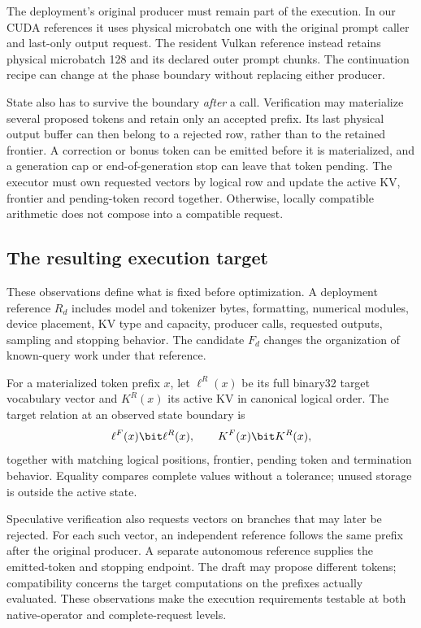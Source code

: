 The deployment's original producer must remain part of the execution. In our CUDA references it uses physical microbatch one with the original prompt caller and last-only output request. The resident Vulkan reference instead retains physical microbatch 128 and its declared outer prompt chunks. The continuation recipe can change at the phase boundary without replacing either producer.

State also has to survive the boundary \emph{after} a call. Verification may materialize several proposed tokens and retain only an accepted prefix. Its last physical output buffer can then belong to a rejected row, rather than to the retained frontier. A correction or bonus token can be emitted before it is materialized, and a generation cap or end-of-generation stop can leave that token pending. The executor must own requested vectors by logical row and update the active KV, frontier and pending-token record together. Otherwise, locally compatible arithmetic does not compose into a compatible request.

\subsection{The resulting execution target}
These observations define what is fixed before optimization. A deployment reference $R_d$ includes model and tokenizer bytes, formatting, numerical modules, device placement, KV type and capacity, producer calls, requested outputs, sampling and stopping behavior. The candidate $F_d$ changes the organization of known-query work under that reference.

For a materialized token prefix $x$, let $\ell^R(x)$ be its full binary32 target vocabulary vector and $K^R(x)$ its active KV in canonical logical order. The target relation at an observed state boundary is
\begin{equation}
 \ell^F(x)\bit\ell^R(x),\qquad K^F(x)\bit K^R(x),
 \label{eq:contract}
\end{equation}
together with matching logical positions, frontier, pending token and termination behavior. Equality compares complete values without a tolerance; unused storage is outside the active state.

Speculative verification also requests vectors on branches that may later be rejected. For each such vector, an independent reference follows the same prefix after the original producer. A separate autonomous reference supplies the emitted-token and stopping endpoint. The draft may propose different tokens; compatibility concerns the target computations on the prefixes actually evaluated. These observations make the execution requirements testable at both native-operator and complete-request levels.
